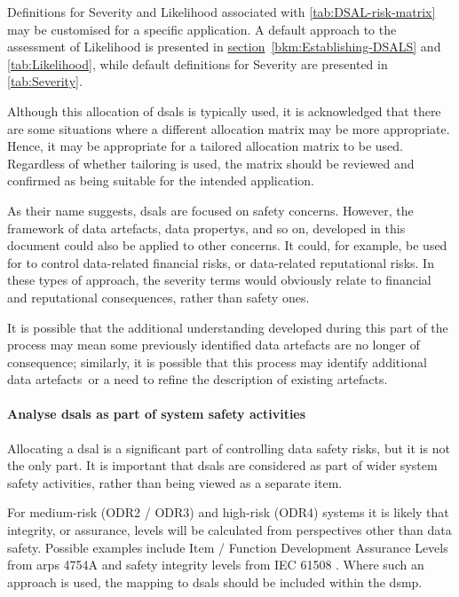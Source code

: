 Definitions for Severity and Likelihood associated with \autoref{tab:DSAL-risk-matrix} may be customised for a specific application. A default approach to the assessment of Likelihood is presented in
\hyperref[bkm:Establishing-DSALS]{section}~\ref{bkm:Establishing-DSALS} %
and \autoref{tab:Likelihood}, while default definitions for Severity are presented in \autoref{tab:Severity}.

Although this allocation of \glspl{dsal} is typically used, it is acknowledged that there are some situations where a different allocation matrix may be more appropriate. Hence, it may be appropriate for a tailored allocation matrix to be used. Regardless of whether tailoring is used, the matrix should be reviewed and confirmed as being suitable for the intended application.

As their name suggests, \glspl{dsal} are focused on safety concerns. However, the framework of \glspl{data artefact}, \glspl{data property}, and so on, developed in this document could also be applied to other concerns. It could, for example, be used for to control data-related financial risks, or data-related reputational risks. In these types of approach, the severity terms would obviously relate to financial and reputational consequences, rather than safety ones.

It is possible that the additional understanding developed during this part of the process may mean some previously identified \glspl{data artefact} are no longer of consequence; similarly, it is possible that this process may identify additional \cbstart\glspl{data artefact}\cbend\ or a need to refine the description of existing artefacts.

\paragraph{Analyse \glspl{dsal} as part of system safety activities}
\label{bkm:activities:analyse:partofsystemsafetyactivities}
Allocating a \gls{dsal} is a significant part of controlling data safety risks, but it is not the only part. It is important that \glspl{dsal} are considered as part of wider system safety activities, rather than being viewed as a separate item.

For medium-risk (ODR2 / ODR3) and high-risk (ODR4) systems it is likely that \gls{integrity}, or assurance, levels will be calculated from perspectives other than data safety. Possible examples include Item / Function Development Assurance Levels from \glspl{arp} 4754A \cite{citation:arp4754a2010guidelines} and safety \gls{integrity} levels from IEC 61508 \cite{citation:iec615083}.
Where such an approach is used, the mapping to \glspl{dsal} should be included within the \gls{dsmp}.

